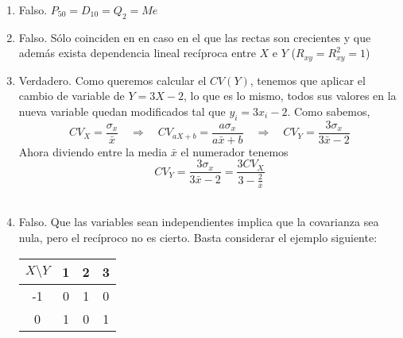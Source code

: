 \documentclass[fleqn]{article}
\def\next{\quad \Rightarrow \quad}
\begin{document}
\begin{enumerate}
                        \begin{enumerate}
                                \item Falso. $P_{50} = D_{10} = Q_2 = Me$\\
                                \item Falso. Sólo coinciden en en caso en el que las rectas son crecientes y que además exista dependencia 
                                                lineal recíproca entre $X$ e $Y$ ($R_{xy} = R_{xy}^2 = 1$) \\
                                \item Verdadero. Como queremos calcular el $CV(Y)$, tenemos que aplicar el cambio de variable 
                                                de $Y = 3X - 2$, lo que es lo mismo, todos sus valores en la nueva variable quedan modificados tal que 
                                                $y_i = 3x_i - 2$. Como sabemos, 
                                                $$CV_X = \frac{\sigma_x}{\bar{x}} \next CV_{aX+b} = \frac{a\sigma_x}{a\bar{x} + b} \next CV_Y = \frac{3\sigma_x}{3\bar{x} - 2}$$
                                                Ahora diviendo entre la media $\bar{x}$ el numerador tenemos
                                                $$CV_Y = \frac{3\sigma_x}{3\bar{x} - 2} = \frac{3CV_X}{3 - \frac{2}{\bar{x}}} $$\\
                                \item Falso. Que las variables sean independientes implica que la covarianza sea nula, pero el recíproco no 
                                                es cierto. Basta considerar el ejemplo siguiente: 
                                                \begin{center}
                                                        \begin{tabular}{c|c c c}
                                                                $X\setminus Y$ & 1 & 2 & 3 \\
                                                                \hline
                                                                -1 & 0 & 1 & 0 \\
                                                                
                                                                0 & 1 & 0 & 1 \\
                                                                

\end{tabular}
\end{center}
\end{enumerate}
\end{enumerate}
\end{document}
